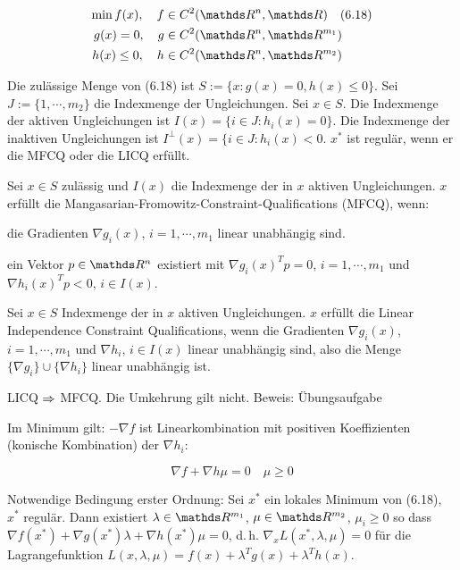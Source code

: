 \begin{align*}
\min f(x),\quad  f & \in C^2(\R^n, \R) \quad (6.18)\\
g(x)=0,\quad  g & \in C^2(\R^n, \R^{m_1}) \\
h(x) \leq 0,\quad  h & \in C^2(\R^n, \R^{m_2}) \\
\end{align*}

Die zulässige Menge von (6.18) ist $S := \{x: g(x)=0, h(x) \leq 0 \}$. Sei $J := \{1,\cdots,m_2\}$ die Indexmenge der Ungleichungen. Sei $x \in S$. Die Indexmenge der aktiven Ungleichungen ist $I(x) = \{i\in J : h_i(x) = 0\}$. Die Indexmenge der inaktiven Ungleichungen ist $I^\perp (x) = \{ i \in J: h_i(x) < 0$. $x^*$ ist regulär, wenn er die MFCQ oder die LICQ erfüllt.


Sei $x \in S$ zulässig und $I(x)$ die Indexmenge der in $x$ aktiven Ungleichungen. $x$ erfüllt die Mangasarian-Fromowitz-Constraint-Qualifications (MFCQ), wenn:

\bitm
\item die Gradienten $\nabla g_i(x)$, $i=1,\cdots, m_1$ linear unabhängig sind.
\item ein Vektor $p \in \R^n$ existiert mit $\nabla g_i(x)^T p = 0$, $i=1,\cdots,m_1$ und $\nabla h_i(x)^T p < 0$, $i \in I(x)$.
\eitm


Sei $x\in S$ Indexmenge der in $x$ aktiven Ungleichungen. $x$ erfüllt die Linear Independence Constraint Qualifications, wenn die Gradienten $\nabla g_i(x)$, $i=1,\cdots,m_1$ und $\nabla h_i$, $i \in I(x)$ linear unabhängig sind, also die Menge $\{ \nabla g_i \} \cup \{ \nabla h_i \}$ linear unabhängig ist.


LICQ $\Rightarrow$ MFCQ. Die Umkehrung gilt nicht. Beweis: Übungsaufgabe

Im Minimum gilt: $-\nabla f$ ist Linearkombination mit positiven Koeffizienten (konische Kombination) der $\nabla h_i$:

\[ \nabla f + \nabla h \mu = 0 \quad \mu \geq 0 \]


\bitm
\item Notwendige Bedingung erster Ordnung: Sei $x^*$ ein lokales Minimum von (6.18), $x^*$ regulär. Dann existiert $\lambda \in \R^{m_1}$, $\mu \in \R^{m_2}$, $\mu_i \geq 0$ so dass $\nabla f(x^*) + \nabla g(x^*) \lambda + \nabla h(x^*) \mu = 0$, d.\,h. $\nabla_x L(x^*, \lambda, \mu) = 0$ für die Lagrangefunktion $L(x,\lambda, \mu) = f(x) + \lambda^T g(x) + \lambda^T h(x)$.

